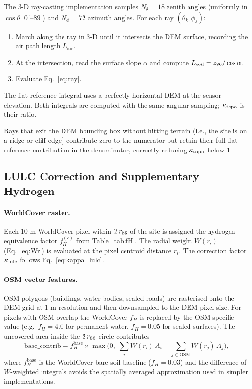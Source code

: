 The 3-D ray-casting implementation samples $N_\theta = 18$ zenith
angles (uniformly in $\cos\theta$, $0^\circ$–$89^\circ$) and
$N_\phi = 72$ azimuth angles.
For each ray $(\theta_k, \phi_j)$:
\begin{enumerate}[nosep]
  \item March along the ray in 3-D until it intersects the DEM
        surface, recording the air path length $L_\mathrm{air}$.
  \item At the intersection, read the surface slope $\alpha$ and
        compute $L_\mathrm{soil} = z_{86} / \cos\alpha$.
  \item Evaluate Eq.~\eqref{eq:ray}.
\end{enumerate}
The flat-reference integral uses a perfectly horizontal DEM at
the sensor elevation.
Both integrals are computed with the same angular sampling;
$\kappa_\mathrm{topo}$ is their ratio.

Rays that exit the DEM bounding box without hitting terrain
(i.e., the site is on a ridge or cliff edge) contribute zero to the
numerator but retain their full flat-reference contribution in the
denominator, correctly reducing $\kappa_\mathrm{topo}$ below 1.

\subsection{LULC Correction and Supplementary Hydrogen}
\label{sec:methods:kL}

\paragraph{WorldCover raster.}
Each 10-m WorldCover pixel within $2\,r_{86}$ of the site is assigned
the hydrogen equivalence factor $f_H^{(c)}$ from Table~\ref{tab:fH}.
The radial weight $W(r_i)$ (Eq.~\eqref{eq:Wr}) is evaluated at the
pixel centroid distance $r_i$.
The correction factor $\kappa_\mathrm{lulc}$ follows Eq.~\eqref{eq:kappa_lulc}.

\paragraph{OSM vector features.}
OSM polygons (buildings, water bodies, sealed roads) are rasterised
onto the DEM grid at 1-m resolution and then downsampled to the
DEM pixel size.
For pixels with OSM overlap the WorldCover $f_H$ is replaced by the
OSM-specific value (e.g.\ $f_H = 4.0$ for permanent water,
$f_H = 0.05$ for sealed surfaces).
The uncovered area inside the $2\,r_{86}$ circle contributes
\begin{equation}
  \mathrm{base\_contrib} =
    f_H^\mathrm{base} \times
    \max\!\bigl(0,\;
      \textstyle\sum_i W(r_i)\,A_i - \sum_{j\in\mathrm{OSM}} W(r_j)\,A_j
    \bigr),
  \label{eq:osm_baseline}
\end{equation}
where $f_H^\mathrm{base}$ is the WorldCover bare-soil baseline
($f_H = 0.03$) and the difference of $W$-weighted integrals
avoids the spatially averaged approximation used in simpler
implementations.


